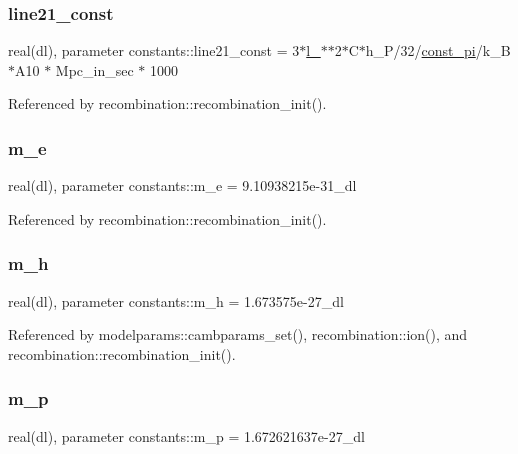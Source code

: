 \subsubsection{\texorpdfstring{line21\+\_\+const}{line21\_const}}
{\footnotesize\ttfamily real(dl), parameter constants\+::line21\+\_\+const = 3$\ast$\mbox{\hyperlink{namespaceconstants_af1bb81b6c283a010f3e86c321579edb0}{l\+\_\+21cm}}$\ast$$\ast$2$\ast$C$\ast$h\+\_\+P/32/\mbox{\hyperlink{namespaceconstants_ae6b5af15d3fb28a3dba468486c548447}{const\+\_\+pi}}/k\+\_\+B$\ast$A10 $\ast$ Mpc\+\_\+in\+\_\+sec $\ast$ 1000}



Referenced by recombination\+::recombination\+\_\+init().

\mbox{\label{namespaceconstants_a9337199d9a72664967dbaf4132e99266}} 
\subsubsection{\texorpdfstring{m\+\_\+e}{m\_e}}
{\footnotesize\ttfamily real(dl), parameter constants\+::m\+\_\+e = 9.\+10938215e-\/31\+\_\+dl}



Referenced by recombination\+::recombination\+\_\+init().

\mbox{\label{namespaceconstants_a0246217a8783fa2adbd3bba601bfb7fb}} 
\subsubsection{\texorpdfstring{m\+\_\+h}{m\_h}}
{\footnotesize\ttfamily real(dl), parameter constants\+::m\+\_\+h = 1.\+673575e-\/27\+\_\+dl}



Referenced by modelparams\+::cambparams\+\_\+set(), recombination\+::ion(), and recombination\+::recombination\+\_\+init().

\mbox{\label{namespaceconstants_af32db00e3c1473bdccb379fea19b3921}} 
\subsubsection{\texorpdfstring{m\+\_\+p}{m\_p}}
{\footnotesize\ttfamily real(dl), parameter constants\+::m\+\_\+p = 1.\+672621637e-\/27\+\_\+dl}

